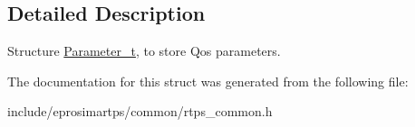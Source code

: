\subsection{\-Detailed \-Description}
\-Structure \hyperlink{structeprosima_1_1rtps_1_1_parameter__t}{\-Parameter\-\_\-t}, to store \-Qos parameters. 

\-The documentation for this struct was generated from the following file\-:\begin{DoxyCompactItemize}
\item 
include/eprosimartps/common/rtps\-\_\-common.\-h\end{DoxyCompactItemize}
